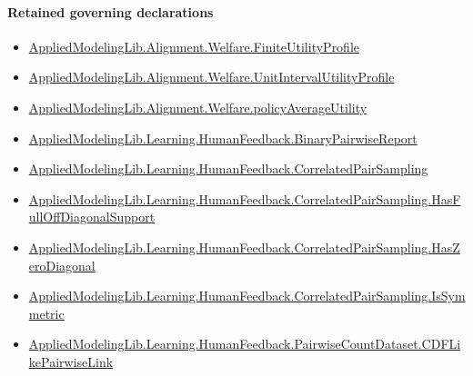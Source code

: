 \documentclass[10pt]{article}
\begin{document}
\paragraph{Retained governing declarations}
\begin{itemize}\raggedright
\item \hyperlink{library-prerequisite-56c0734f8877ddbe}{Applied\allowbreak{}Modeling\allowbreak{}Lib.\allowbreak{}Alignment.\allowbreak{}Welfare.\allowbreak{}Finite\allowbreak{}Utility\allowbreak{}Profile}
\item \hyperlink{library-prerequisite-cbe8afa0d6d1ba78}{Applied\allowbreak{}Modeling\allowbreak{}Lib.\allowbreak{}Alignment.\allowbreak{}Welfare.\allowbreak{}Unit\allowbreak{}Interval\allowbreak{}Utility\allowbreak{}Profile}
\item \hyperlink{library-prerequisite-184c74a4db4311c2}{Applied\allowbreak{}Modeling\allowbreak{}Lib.\allowbreak{}Alignment.\allowbreak{}Welfare.\allowbreak{}policy\allowbreak{}Average\allowbreak{}Utility}
\item \hyperlink{governing-declaration-bc3d6ca8e7e0ac9d}{Applied\allowbreak{}Modeling\allowbreak{}Lib.\allowbreak{}Learning.\allowbreak{}Human\allowbreak{}Feedback.\allowbreak{}Binary\allowbreak{}Pairwise\allowbreak{}Report}
\item \hyperlink{governing-declaration-588529a2add6b6a9}{Applied\allowbreak{}Modeling\allowbreak{}Lib.\allowbreak{}Learning.\allowbreak{}Human\allowbreak{}Feedback.\allowbreak{}Correlated\allowbreak{}Pair\allowbreak{}Sampling}
\item \hyperlink{governing-declaration-4ded7e185e3a56c5}{Applied\allowbreak{}Modeling\allowbreak{}Lib.\allowbreak{}Learning.\allowbreak{}Human\allowbreak{}Feedback.\allowbreak{}Correlated\allowbreak{}Pair\allowbreak{}Sampling.\allowbreak{}Has\allowbreak{}Full\allowbreak{}Off\allowbreak{}Diagonal\allowbreak{}Support}
\item \hyperlink{governing-declaration-28f7d7214bf02489}{Applied\allowbreak{}Modeling\allowbreak{}Lib.\allowbreak{}Learning.\allowbreak{}Human\allowbreak{}Feedback.\allowbreak{}Correlated\allowbreak{}Pair\allowbreak{}Sampling.\allowbreak{}Has\allowbreak{}Zero\allowbreak{}Diagonal}
\item \hyperlink{governing-declaration-11432d593d43fd7d}{Applied\allowbreak{}Modeling\allowbreak{}Lib.\allowbreak{}Learning.\allowbreak{}Human\allowbreak{}Feedback.\allowbreak{}Correlated\allowbreak{}Pair\allowbreak{}Sampling.\allowbreak{}Is\allowbreak{}Symmetric}
\item \hyperlink{governing-declaration-3449f3559185d0fd}{Applied\allowbreak{}Modeling\allowbreak{}Lib.\allowbreak{}Learning.\allowbreak{}Human\allowbreak{}Feedback.\allowbreak{}Pairwise\allowbreak{}Count\allowbreak{}Dataset.\allowbreak{}CDF\allowbreak{}Like\allowbreak{}Pairwise\allowbreak{}Link}

\end{itemize}
\end{document}
